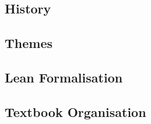 
\subsection{History}


\subsection{Themes}


\subsection{Lean Formalisation}


\subsection{Textbook Organisation}


